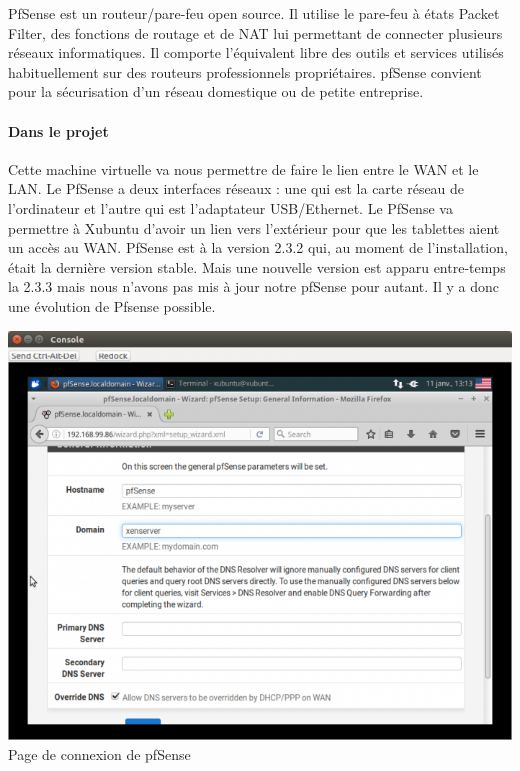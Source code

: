 \documentclass[a4paper,12pt]{extarticle}
\begin{document}
PfSense est un routeur/pare-feu open source. Il utilise le pare-feu à états Packet Filter, des fonctions de routage et de NAT lui permettant de connecter plusieurs réseaux informatiques. Il comporte l'équivalent libre des outils et services utilisés habituellement sur des routeurs professionnels propriétaires. pfSense convient pour la sécurisation d'un réseau domestique ou de petite entreprise.


\paragraph{Dans le projet\\}

Cette machine virtuelle va nous permettre de faire le lien entre le WAN et le LAN. Le PfSense a deux interfaces réseaux : une qui est la carte réseau de l’ordinateur et l’autre qui est l’adaptateur USB/Ethernet. Le PfSense va permettre à Xubuntu d’avoir un lien vers l’extérieur pour que les tablettes aient un accès au WAN. \newline
PfSense est à la version 2.3.2 qui, au moment de l’installation, était la dernière version stable. Mais une nouvelle version est apparu entre-temps la 2.3.3 mais nous n’avons pas mis à jour notre pfSense pour autant. Il y a donc une évolution de Pfsense possible.  

\begin{center}
\includegraphics[scale=0.65]{pfsense}\\
Page de connexion de pfSense
\end{center}
\end{document}
